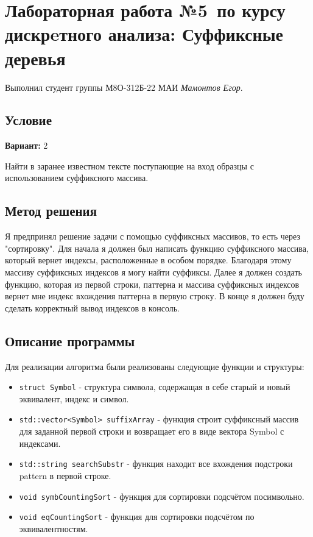 \documentclass[12pt]{article}
\begin{document}
\section*{Лабораторная работа №5\, по курсу дискрeтного анализа: Суффиксные деревья}

Выполнил студент группы М8О-312Б-22 МАИ \textit{Мамонтов Егор}.

\subsection*{Условие}

\textbf{Вариант:} 2

Найти в заранее известном тексте поступающие на вход образцы с использованием суффиксного массива.

\newpage
\subsection*{Метод решения}

Я предпринял решение задачи с помощью суффиксных массивов, то есть через "сортировку". 
Для начала я должен был написать функцию суффиксного массива, который вернет индексы, расположенные в особом порядке. Благодаря этому массиву суффиксных индексов я могу найти суффиксы.
Далее я должен создать функцию, которая из первой строки, паттерна и массива суффиксных индексов вернет мне индекс вхождения паттерна в первую строку. В конце я должен буду сделать корректный вывод индексов в консоль.
\subsection*{Описание программы}

Для реализации алгоритма были реализованы следующие функции и структуры:
\begin{itemize}
    \item \texttt{struct Symbol} - структура символа, содержащая в себе старый и новый эквивалент, индекс и символ.
    \item \texttt{std::vector<Symbol> suffixArray} - функция строит суффиксный массив для заданной первой строки и возвращает его в виде вектора Symbol с индексами.
    \item \texttt{std::string searchSubstr} - функция находит все вхождения подстроки pattern в первой строке.
    \item \texttt{void symbCountingSort} - функция для сортировки подсчётом посимвольно.
    \item \texttt{void eqCountingSort} - функция для сортировки подсчётом по эквивалентностям.
\end{itemize}
\end{document}
